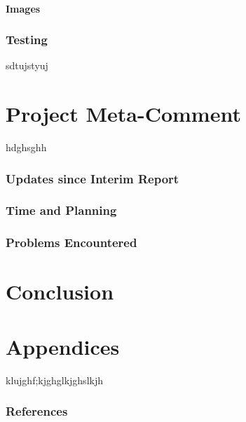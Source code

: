 \documentclass[10pt,a4paper]{article}
\begin{document}
\subsection{Images}

\section{Testing}
sdtujstyuj

\part{Project Meta-Comment}
hdghsghh
\section{Updates since Interim Report}

\section{Time and Planning}

\section{Problems Encountered}


\part{Conclusion}

\part{Appendices}
klujghf;kjghglkjghslkjh
\section{References}


\end{document}
